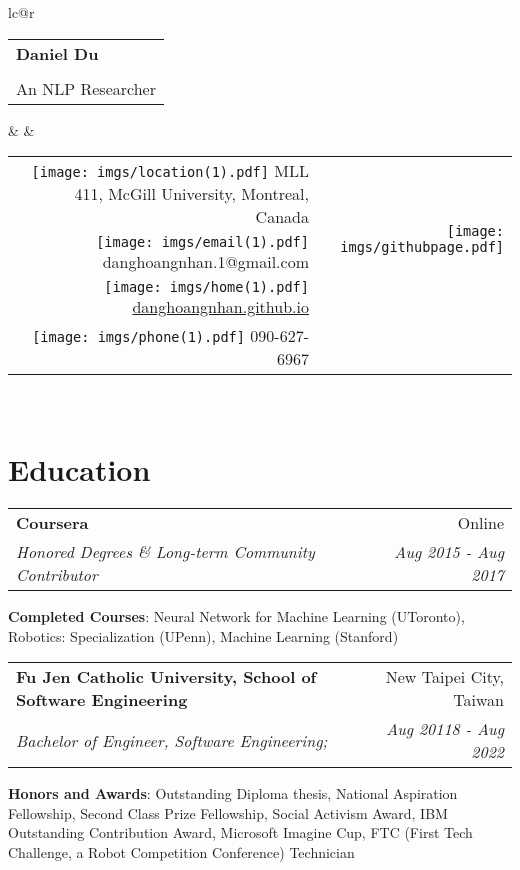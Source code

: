 \documentclass[letterpaper,10pt]{article}
\makeatletter
\newcommand{\resumeItemNoBullet}[2]{
  \item[]\small{
    \hspace{-9pt}\textbf{#1}{: #2 \vspace{-6pt}}
  }
}
\newcommand{\resumeSubheading}[4]{
  \vspace{-1pt}\item[]
  \begin{tabular*}{0.98\textwidth}{l@{\extracolsep{\fill}}r}
      \hspace{-10pt}\textbf{#1} & #2 \\
      \hspace{-10pt}\textit{\small#3} & \textit{\small #4} \\
    \end{tabular*}\vspace{-5pt}
}
\newcommand{\resumeSubHeadingListStart}{\begin{itemize}[leftmargin=*]}
\newcommand{\resumeSubHeadingListEnd}{\end{itemize}}
\newcommand{\shorterSection}[1]{\vspace{-10pt}\section{#1}}
\makeatother
\begin{document}

\begin{table}[]
\begin{tabular*}{\textwidth}{lc@{\extracolsep{\fill}}r}
\begin{tabular}{l}
\textbf{\huge \textcolor{titleblue}{Daniel Du}} \\
\\
An NLP Researcher   
\end{tabular}  &  & \begin{tabular}{@{}rr@{}} \textcolor{titleblue}{\texttt{[image: imgs/location(1).pdf]}} MLL 411, McGill University, Montreal, Canada & \multirow{3}{*}{\texttt{[image: imgs/githubpage.pdf]}} \\
\texttt{[image: imgs/email(1).pdf]} danghoangnhan.1@gmail.com                     &                   \\
\texttt{[image: imgs/home(1).pdf]} \href{http://danghoangnhan.github.io}{danghoangnhan.github.io}                            &                   \\
\texttt{[image: imgs/phone(1).pdf]} 090-627-6967                                  &                   
\end{tabular}  \\ 
\end{tabular*}
\end{table}

\vspace*{-10mm}


\shorterSection{\textcolor{titleblue}{Education}}
  \resumeSubHeadingListStart
    \resumeSubheading
      {Coursera}{Online}     {Honored Degrees \& Long-term Community Contributor}{Aug 2015 - Aug 2017}{
      \resumeItemNoBullet{Completed Courses}{Neural Network for Machine Learning (UToronto), Robotics: Specialization (UPenn), Machine Learning (Stanford)}
    }
    \resumeSubheading
      {Fu Jen Catholic University, School of Software Engineering}{New Taipei City, Taiwan}     {Bachelor of Engineer, Software Engineering;  }{Aug 20118 - Aug 2022}{
      \resumeItemNoBullet{Honors and Awards}{Outstanding Diploma thesis, National Aspiration Fellowship, Second Class Prize Fellowship, Social Activism Award, IBM
Outstanding Contribution Award, Microsoft Imagine Cup, FTC (First Tech Challenge, a Robot Competition Conference) Technician}
    }
  \resumeSubHeadingListEnd
\end{document}
